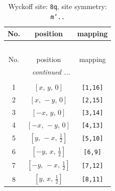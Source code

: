 \documentclass[fleqn,8pt]{jsarticle}
\begin{document}
\begin{longtable}{ccc}
\caption{Wyckoff site: {\tt 8q}, site symmetry: {\tt m'..}}
 \\
 \hline \hline
No. & position & mapping \\ \hline \endfirsthead

\multicolumn{2}{l}{\tablename\ \thetable{}} \\
 \hline \hline
No. & position & mapping \\ \hline \endhead

 \hline \hline
\multicolumn{2}{r}{\footnotesize\it continued ...} \\ \endfoot

 \hline \hline
\multicolumn{2}{r}{} \\ \endlastfoot

1 & $\left[ x,\, y,\, 0 \right]$ & {\tt [1,16]} \\ \hline
2 & $\left[ x,\, - y,\, 0 \right]$ & {\tt [2,15]} \\ \hline
3 & $\left[ - x,\, y,\, 0 \right]$ & {\tt [3,14]} \\ \hline
4 & $\left[ - x,\, - y,\, 0 \right]$ & {\tt [4,13]} \\ \hline
5 & $\left[ y,\, - x,\, \frac{1}{2} \right]$ & {\tt [5,10]} \\ \hline
6 & $\left[ - y,\, x,\, \frac{1}{2} \right]$ & {\tt [6,9]} \\ \hline
7 & $\left[ - y,\, - x,\, \frac{1}{2} \right]$ & {\tt [7,12]} \\ \hline
8 & $\left[ y,\, x,\, \frac{1}{2} \right]$ & {\tt [8,11]} \\
\end{longtable}
\renewcommand{\arraystretch}{1.2}
\end{document}
